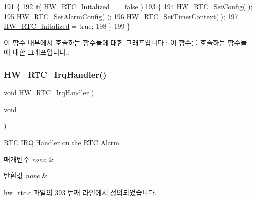 \begin{DoxyCode}
191 \{
192   \textcolor{keywordflow}{if}( \mbox{\hyperlink{hw__rtc_8c_a0cc445fee543cc142d19757f0f583a21}{HW\_RTC\_Initalized}} == \textcolor{keyword}{false} )
193   \{
194     \mbox{\hyperlink{group___lory_s_d_k___r_t_c___functions_ga6eeed66a0970c9b0f48a7e2088b524f1}{HW\_RTC\_SetConfig}}( );
195     \mbox{\hyperlink{group___lory_s_d_k___r_t_c___functions_ga38285b86b2811230b0a55416ce3c33c7}{HW\_RTC\_SetAlarmConfig}}( );
196     \mbox{\hyperlink{group___lory_s_d_k___r_t_c___functions_gad0a54228cfe8473d90b901ebd76de1d5}{HW\_RTC\_SetTimerContext}}( );
197     \mbox{\hyperlink{hw__rtc_8c_a0cc445fee543cc142d19757f0f583a21}{HW\_RTC\_Initalized}} = \textcolor{keyword}{true};
198   \}
199 \}
\end{DoxyCode}
이 함수 내부에서 호출하는 함수들에 대한 그래프입니다.\+:
이 함수를 호출하는 함수들에 대한 그래프입니다.\+:
\mbox{\label{group___lory_s_d_k___r_t_c___functions_gae8ae8ef64d3025701112d509285006d4}} 
\subsubsection{\texorpdfstring{H\+W\+\_\+\+R\+T\+C\+\_\+\+Irq\+Handler()}{HW\_RTC\_IrqHandler()}}
{\footnotesize\ttfamily void H\+W\+\_\+\+R\+T\+C\+\_\+\+Irq\+Handler (\begin{DoxyParamCaption}\item[{void}]{ }\end{DoxyParamCaption})}



R\+TC I\+RQ Handler on the R\+TC Alarm 


\begin{DoxyParams}{매개변수}
{\em none} & \\
\hline
\end{DoxyParams}

\begin{DoxyRetVals}{반환값}
{\em none} & \\
\hline
\end{DoxyRetVals}


hw\+\_\+rtc.\+c 파일의 393 번째 라인에서 정의되었습니다.



